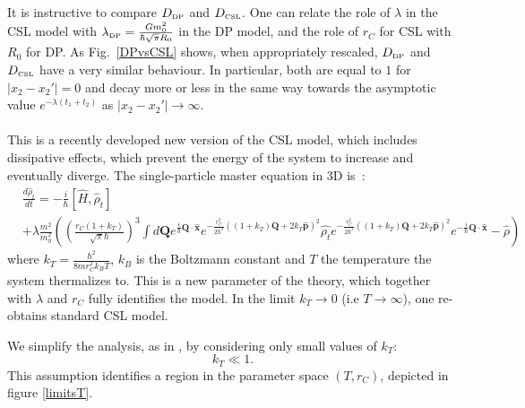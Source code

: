 \documentclass[12pt,groupedaddress,pra,aps]{revtex4-1}
\begin{document}
It is instructive to compare $D_{\text{\tiny DP}}$ and $D_{\text{\tiny CSL}}$. One can relate the role of $\lambda$ in the CSL model with $\lambda_{\text{\tiny DP}}=\frac{G m_0^2}{\hbar \sqrt{\pi} R_0}$ in the DP model, and the role of $r_C$ for CSL with $R_0$ for DP. As Fig.~\ref{DPvsCSL} shows, when appropriately rescaled, $D_{\text{\tiny DP}}$ and $D_{\text{\tiny CSL}}$ have a very similar behaviour. In particular, both are equal to $1$ for  $|x_2-x_2'|=0$ and decay more or less in the same way towards the asymptotic value $e^{-\lambda (t_1+t_2)}$ as $|x_2-x_2'| \rightarrow \infty$. \\ \\

 This is a recently developed new version of the CSL model, which includes dissipative effects, which prevent the energy of the system to increase and eventually diverge.  The single-particle master equation  in 3D is~\cite{Smirne:2014paa,PhysRevA.90.062135}:
\begin{equation}\label{csl_equation_dcsl}
\begin{split}
&\frac{d \hat{\rho}_t}{dt} =  -\frac{i}{\hbar}\left[ \hat{H}, \hat{\rho}_t\right] \\
&+\lambda \frac{m^2}{m_0^2} \left( \left(\frac{r_C(1+k_T) }{\sqrt{\pi} \hbar}\right)^3 
\int d \bm{Q} e^{\frac{i}{\hbar} \bm{Q} \cdot \bm{\hat{x}} }  e^{-\frac{r_C^2}{2\hbar^2}((1+k_T)\bm{Q}+2k_T\bm{\hat{p}})^2 } \hat{\rho_t}
 e^{-\frac{r_C^2}{2\hbar^2}((1+k_T)\bm{Q}+2k_T\bm{\hat{p}})^2 } e^{-\frac{i}{\hbar} \bm{Q}\cdot \bm{\hat{x}} } - \hat{\rho} \right)
\end{split}
\end{equation}
where $k_T=\frac{\hbar^2}{8 m r_C^2 k_B T}$, $k_B$ is the Boltzmann constant and $T$ the temperature the system thermalizes to. This is a new parameter of the theory, which together with $\lambda$ and $r_C$ fully identifies the model. In the limit $k_T \rightarrow 0$ (i.e $T \rightarrow \infty$), one re-obtains standard CSL model. 

We simplify the analysis, as in \cite{PhysRevA.90.062135,Smirne:2014paa}, by considering only small values of $k_T$:
\begin{equation}\label{ktcond}
k_T \ll 1.
\end{equation}
This assumption identifies a region in the parameter space $(T,r_C)$, depicted in figure \ref{limitsT}.
\end{document}
